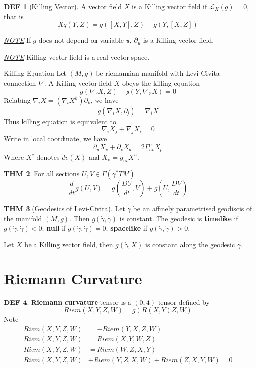 \documentclass[twocolumn]{article}
\renewcommand{\emph}[1]{{\color{blue!70!black}\sffamily\bfseries #1}}
\newcommand{\n}{\nabla}
\newcommand{\p}{\partial}
\newcommand{\G}{\Gamma}
\renewcommand{\L}{\mathscr{L}}
\newcommand{\g}{\gamma}
\newcommand{\dg}{\dot{\gamma}}
\newcommand{\N}{\textit{\underline{NOTE} }}
\renewcommand{\dg}{\dot{\gamma}}
\theoremstyle{definition}
\newtheorem{thm}{THM}
\newtheorem{defi}[thm]{DEF}
\begin{document}
\begin{defi}[Killing Vector]
	A vector field $X$ is a Killing vector field if $\L_X(g) = 0$, that is 
	$$
	Xg(Y, Z) = g([X, Y], Z) + g(Y, [X, Z])
	$$
\end{defi}

\N If $g$ does not depend on variable $u$, $\p_u$ is a Killing vector field.

\N Killing vector field is a real vector space.

\begin{fthm}{Killing Equation}{}
	Let $(M, g)$ be riemannian manifold with Levi-Civita connection $\n$. A Killing vector field $X$ obeys the killing equation 
	$$
		g(\n_Y X, Z) + g(Y, \n_Z X) = 0
	$$
	Relabing $\n_i X = (\n_i X^k) \p_k$, we have 
	$$
		g(\n_i X, \p_j) = \n_i X
	$$
	Thus killing equation is equivalent to 
	$$
		\n_i X_j + \n_j X_i = 0
	$$
	Write in local coordinate, we have 
	$$
		\p_u X_v + \p_v X_u = 2 \G_{uv}^p X_p
	$$
	Where $X^v$ denotes $dv(X)$ and $X_v = g_{uv}X^u$.
\end{fthm}

\begin{thm}
	For all sections $U, V \in \G(\g^* TM)$
	$$
	\frac{d}{dt} g(U, V) = g(\frac{DU}{dt} , V) + g(U, \frac{DV}{dt})
	$$
\end{thm}

\begin{thm}[Geodesics of Levi-Civita]
	Let $\g$ be an affinely parametrised geodiscis of the manifold $(M, g)$.
	Then $g(\dg, \dg)$ is constant.
	The geodesic is \emph{timelike} if $g(\dg, \dg) < 0$; \emph{null} if $g(\dg, \dg) = 0$; \emph{spacelike} if $g(\dg, \dg) > 0$.

	Let $X$ be a Killing vector field, then $g(\dg, X)$ is constant along the geodesic $\g$.
\end{thm}

\section{Riemann Curvature}
\begin{defi}
	\emph{Riemann curvature} tensor is a $(0, 4)$ tensor defined by 
	$$
	Riem(X, Y, Z, W) = g(R(X, Y)Z, W)
	$$
	Note 
	\begin{align*}
		Riem(X, Y, Z, W) &= -Riem(Y, X, Z, W) \\
		Riem(X, Y, Z, W) &= Riem(X, Y, W, Z) \\
		Riem(X, Y, Z, W) &= Riem(W, Z, X, Y) \\
		Riem(X, Y, Z, W) &+ Riem(Y, Z, X, W) + Riem(Z, X, Y, W) = 0
	\end{align*}
\end{defi}
\end{document}
